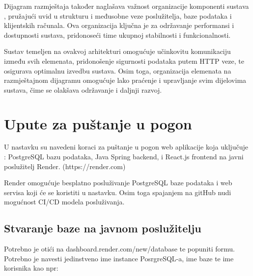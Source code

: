 Dijagram razmještaja također naglašava važnost organizacije komponenti sustava
, pružajući uvid u strukturu i međusobne veze poslužitelja, baze podataka i 
klijentskih računala. Ova organizacija ključna je za održavanje performansi i 
dostupnosti sustava, pridonoseći time ukupnoj stabilnosti i 
funkcionalnosti.

Sustav temeljen na ovakvoj arhitekturi omogućuje učinkovitu komunikaciju 
između svih elemenata, pridonošenje sigurnosti podataka putem HTTP veze, te 
osigurava optimalnu izvedbu sustava. Osim toga, organizacija elemenata na 
razmještajnom dijagramu omogućuje lako praćenje i upravljanje svim dijelovima 
sustava, čime se olakšava održavanje i daljnji razvoj.
			
			\eject 
		
		\section{Upute za puštanje u pogon}
		
U nastavku su navedeni koraci za puštanje u pogon web aplikacije koja uključuje
: PostgreSQL bazu podataka, Java Spring backend, i React.js frontend na javni 
poslužitelj Render. (https://render.com)

Render omogućuje besplatno posluživanje PostgreSQL baze podataka i web servisa 
koji će se koristiti u nastavku. Osim toga spajanjem na gitHub nudi mogućnost 
CI/CD modela posluživanja.

\subsection{Stvaranje baze na javnom poslužitelju}

Potrebno je otići na dashboard.render.com/new/database te popuniti formu. 
Potrebno je navesti jedinstveno ime instance PosrgreSQL-a, ime baze te ime 
korisnika kao npr:

